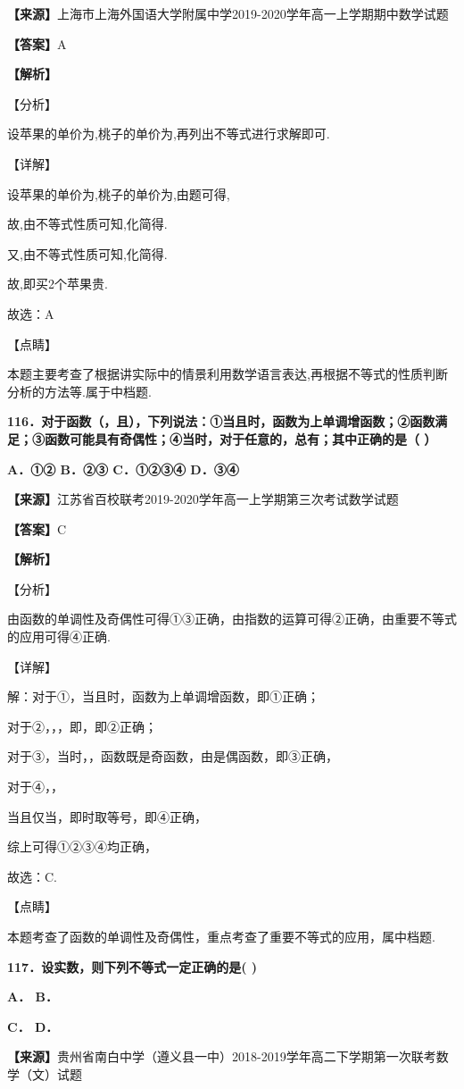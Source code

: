 \textbf{【来源】}上海市上海外国语大学附属中学2019-2020学年高一上学期期中数学试题

\textbf{【答案】}A

\textbf{【解析】}

【分析】

设苹果的单价为,桃子的单价为,再列出不等式进行求解即可.

【详解】

设苹果的单价为,桃子的单价为,由题可得,

故,由不等式性质可知,化简得.

又,由不等式性质可知,化简得.

故,即买2个苹果贵.

故选：A

【点睛】

本题主要考查了根据讲实际中的情景利用数学语言表达,再根据不等式的性质判断分析的方法等.属于中档题.

\textbf{116．对于函数（，且），下列说法：①当且时，函数为上单调增函数；②函数满足；③函数可能具有奇偶性；④当时，对于任意的，总有；其中正确的是（
）}

\textbf{A．①② B．②③ C．①②③④ D．③④}

\textbf{【来源】}江苏省百校联考2019-2020学年高一上学期第三次考试数学试题

\textbf{【答案】}C

\textbf{【解析】}

【分析】

由函数的单调性及奇偶性可得①③正确，由指数的运算可得②正确，由重要不等式的应用可得④正确.

【详解】

解：对于①，当且时，函数为上单调增函数，即①正确；

对于②，，，即，即②正确；

对于③，当时，，函数既是奇函数，由是偶函数，即③正确，

对于④，，

当且仅当，即时取等号，即④正确，

综上可得①②③④均正确，

故选：C.

【点睛】

本题考查了函数的单调性及奇偶性，重点考查了重要不等式的应用，属中档题.

\textbf{117．设实数，则下列不等式一定正确的是( )}

\textbf{A． B．}

\textbf{C． D．}

\textbf{【来源】}贵州省南白中学（遵义县一中）2018-2019学年高二下学期第一次联考数学（文）试题

